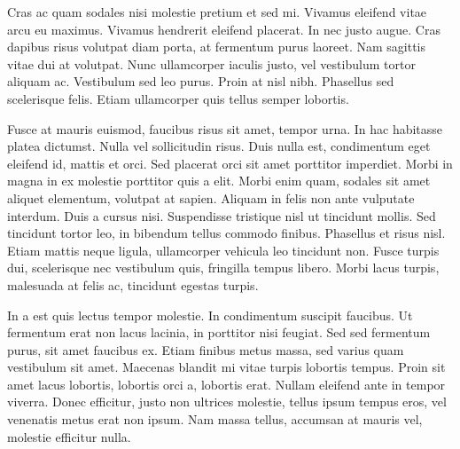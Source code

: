 \documentclass[12pt,a4paper,twocolumn]{article}
\begin{document}
    Cras ac quam sodales nisi molestie pretium et sed mi. Vivamus eleifend vitae arcu eu maximus. Vivamus hendrerit eleifend placerat. In nec justo augue. Cras dapibus risus volutpat diam porta, at fermentum purus laoreet. Nam sagittis vitae dui at volutpat. Nunc ullamcorper iaculis justo, vel vestibulum tortor aliquam ac. Vestibulum sed leo purus. Proin at nisl nibh. Phasellus sed scelerisque felis. Etiam ullamcorper quis tellus semper lobortis.

    Fusce at mauris euismod, faucibus risus sit amet, tempor urna. In hac habitasse platea dictumst. Nulla vel sollicitudin risus. Duis nulla est, condimentum eget eleifend id, mattis et orci. Sed placerat orci sit amet porttitor imperdiet. Morbi in magna in ex molestie porttitor quis a elit. Morbi enim quam, sodales sit amet aliquet elementum, volutpat at sapien. Aliquam in felis non ante vulputate interdum. Duis a cursus nisi. Suspendisse tristique nisl ut tincidunt mollis. Sed tincidunt tortor leo, in bibendum tellus commodo finibus. Phasellus et risus nisl. Etiam mattis neque ligula, ullamcorper vehicula leo tincidunt non. Fusce turpis dui, scelerisque nec vestibulum quis, fringilla tempus libero. Morbi lacus turpis, malesuada at felis ac, tincidunt egestas turpis.

    In a est quis lectus tempor molestie. In condimentum suscipit faucibus. Ut fermentum erat non lacus lacinia, in porttitor nisi feugiat. Sed sed fermentum purus, sit amet faucibus ex. Etiam finibus metus massa, sed varius quam vestibulum sit amet. Maecenas blandit mi vitae turpis lobortis tempus. Proin sit amet lacus lobortis, lobortis orci a, lobortis erat. Nullam eleifend ante in tempor viverra. Donec efficitur, justo non ultrices molestie, tellus ipsum tempus eros, vel venenatis metus erat non ipsum. Nam massa tellus, accumsan at mauris vel, molestie efficitur nulla.

    
    
\end{document}

